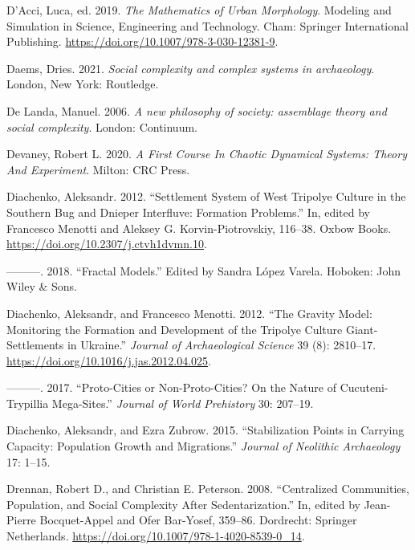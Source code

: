 \documentclass[
  12pt,
  a4paper, twoside]{book}
\newlength{\cslhangindent}
\newlength{\cslentryspacingunit} %
\newenvironment{CSLReferences}[2] %
 {%
  \setlength{\parindent}{0pt}
  \ifodd #1
  \let\oldpar\par
  \def\par{\hangindent=\cslhangindent\oldpar}
  \fi
  \setlength{\parskip}{#2\cslentryspacingunit}
 }%
 {}
\begin{document}
\begin{CSLReferences}{1}{0}
\leavevmode{}%
D'Acci, Luca, ed. 2019. \emph{The Mathematics of Urban Morphology}. Modeling and Simulation in Science, Engineering and Technology. Cham: Springer International Publishing. \url{https://doi.org/10.1007/978-3-030-12381-9}.

\leavevmode{}%
Daems, Dries. 2021. \emph{Social complexity and complex systems in archaeology}. London, New York: Routledge.

\leavevmode{}%
De Landa, Manuel. 2006. \emph{A new philosophy of society: assemblage theory and social complexity}. London: Continuum.

\leavevmode{}%
Devaney, Robert L. 2020. \emph{A First Course In Chaotic Dynamical Systems: Theory And Experiment}. Milton: CRC Press.

\leavevmode{}%
Diachenko, Aleksandr. 2012. {``Settlement System of West Tripolye Culture in the Southern Bug and Dnieper Interfluve: Formation Problems.''} In, edited by Francesco Menotti and Aleksey G. Korvin-Piotrovskiy, 116--38. Oxbow Books. \url{https://doi.org/10.2307/j.ctvh1dvmn.10}.

\leavevmode{}%
---------. 2018. {``Fractal Models.''} Edited by Sandra López Varela. Hoboken: John Wiley \& Sons.

\leavevmode{}%
Diachenko, Aleksandr, and Francesco Menotti. 2012. {``The Gravity Model: Monitoring the Formation and Development of the Tripolye Culture Giant-Settlements in Ukraine.''} \emph{Journal of Archaeological Science} 39 (8): 2810--17. \url{https://doi.org/10.1016/j.jas.2012.04.025}.

\leavevmode{}%
---------. 2017. {``Proto-Cities or Non-Proto-Cities? On the Nature of Cucuteni-Trypillia Mega-Sites.''} \emph{Journal of World Prehistory} 30: 207--19.

\leavevmode{}%
Diachenko, Aleksandr, and Ezra Zubrow. 2015. {``Stabilization Points in Carrying Capacity: Population Growth and Migrations.''} \emph{Journal of Neolithic Archaeology} 17: 1--15.

\leavevmode{}%
Drennan, Robert D., and Christian E. Peterson. 2008. {``Centralized Communities, Population, and Social Complexity After Sedentarization.''} In, edited by Jean-Pierre Bocquet-Appel and Ofer Bar-Yosef, 359--86. Dordrecht: Springer Netherlands. \url{https://doi.org/10.1007/978-1-4020-8539-0_14}.


\end{CSLReferences}
\end{document}
